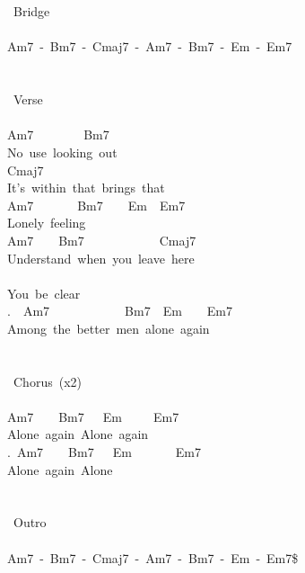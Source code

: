 {\\
\\
\lbrack\ Bridge\rbrack\\
\\
Am7\ -\ Bm7\ -\ Cmaj7\ -\ Am7\ -\ Bm7\ -\ Em\ -\ Em7\\
\\
\\
\lbrack\ Verse\rbrack\\
\\
Am7\ \ \ \ \ \ \ \ Bm7\ \ \ \ \ \ \ \ \ \\
No\ use\ looking\ out\\
Cmaj7\ \ \ \ \ \ \ \ \ \ \ \ \ \ \ \ \ \ \ \ \\
It's\ within\ that\ brings\ that\ \ \\
Am7\ \ \ \ \ \ \ Bm7\ \ \ \ Em\ \ Em7\\
Lonely\ feeling\\
Am7\ \ \ \ Bm7\ \ \ \ \ \ \ \ \ \ \ \ Cmaj7\\
Understand\ when\ you\ leave\ here\\
\ \ \ \ \ \ \ \ \ \ \\
You\ be\ clear\\
.\ \ Am7\ \ \ \ \ \ \ \ \ \ \ \ Bm7\ \ Em\ \ \ \ Em7\\
Among\ the\ better\ men\ alone\ again\\
\\
\\
\lbrack\ Chorus\rbrack\ (x2)\ \\
\\
Am7\ \ \ \ Bm7\ \ \ Em\ \ \ \ \ Em7\\
Alone\ again\ Alone\ again\\
.\ Am7\ \ \ \ Bm7\ \ \ Em\ \ \ \ \ \ \ Em7\\
Alone\ again\ Alone\\
\\
\\
\lbrack\ Outro\rbrack\\
\\
Am7\ -\ Bm7\ -\ Cmaj7\ -\ Am7\ -\ Bm7\ -\ Em\ -\ Em7\$}

